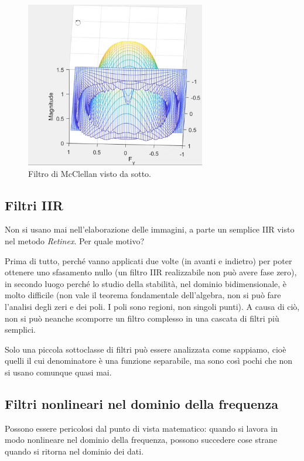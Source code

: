 \documentclass[a4paper,11pt]{article}
\begin{document}
\renewcommand{\thefigure}{6.11}
\begin{figure}[!h]
  \centering
    \includegraphics[scale=0.6]{images/6/bandpass_mcclellan_dc.png}
    \caption{Filtro di McClellan visto da sotto.}
\end{figure}

\subsection{Filtri IIR}
Non si usano mai nell'elaborazione delle immagini, a parte un semplice IIR visto nel metodo \textit{Retinex}. Per quale motivo?
\par
Prima di tutto, perché vanno applicati due volte (in avanti e indietro) per poter ottenere uno sfasamento nullo (un filtro IIR realizzabile non può avere fase zero),
in secondo luogo perché lo studio della stabilità, nel dominio bidimensionale, è molto difficile (non vale il teorema fondamentale dell'algebra,
non si può fare l'analisi degli zeri e dei poli. I poli sono regioni, non singoli punti). A causa di ciò, non si può neanche
scomporre un filtro complesso in una cascata di filtri più semplici.
\par
Solo una piccola sottoclasse di filtri può essere analizzata come sappiamo, cioè quelli il cui denominatore è una funzione separabile, ma sono
così pochi che non si usano comunque quasi mai.


\subsection{Filtri nonlineari nel dominio della frequenza}
Possono essere pericolosi dal punto di vista matematico: quando si lavora in modo nonlineare nel dominio della frequenza,
possono succedere cose strane quando si ritorna nel dominio dei dati.
\end{document}
